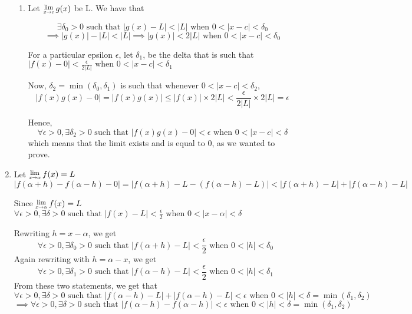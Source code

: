 \documentclass{article}
\newcommand{\Lim}[1]{\raisebox{0.5ex}{\scalebox{0.8}{$\displaystyle \lim_{#1}\;$}}}
\begin{document}
\begin{enumerate}
\begin{enumerate}
                         \item Let $\Lim{x \to c} g(x)$ be L. We have that 

                                 $$\exists \delta_0 > 0 \text{ such that } |g(x) - L| < |L|\text{ when } 0 < |x-c| < \delta_0$$
                                 $$\implies |g(x)| - |L| < |L| \implies |g(x)| < 2|L| \text{ when } 0 < |x-c| < \delta_0$$

                                 For a particular epsilon $\epsilon$, let $\delta_1$, be the delta that is such that 
                                 $|f(x) - 0 | < \frac{\epsilon}{2|L|} \text{ when } 0 < |x-c| < \delta_1$

                         Now, $\delta_2 = \min(\delta_0, \delta_1)$ is such that  whenever $0 < |x-c| < \delta_2$, 
                                 $$|f(x)g(x) - 0| = |f(x)g(x)| \leq |f(x)| \times 2|L| < \frac{\epsilon}{2|L|} \times 2|L| = \epsilon$$

                                 Hence,
                         $$\forall \epsilon>0, \exists \delta_2>0  \text{ such that } |f(x)g(x) - 0| < \epsilon  \text{ when } 0 < |x-c| < \delta$$
                         which means that the limit exists and is equal to $0$, as we wanted to prove.
                \end{enumerate}
        \item Let $\Lim{x\to \alpha}f(x) = L$
                $$|f(\alpha+h) - f(\alpha-h) - 0| = |f(\alpha+h) - L - (f(\alpha-h) - L)| < |f(\alpha+h)-L| + |f(\alpha-h) - L|$$

                Since $\Lim{x\to \alpha}f(x) = L$
                $\forall \epsilon>0, \exists \delta>0  \text{ such that } |f(x) - L| < \frac{\epsilon}{2}  \text{ when } 0 < |x-\alpha| < \delta $

                Rewriting $h = x-\alpha$, we get
                $$
                \forall \epsilon>0, \exists \delta_0>0  \text{ such that } |f(\alpha + h) - L| < \frac{\epsilon}{2}  \text{ when } 0 < |h| < \delta_0
                $$
                Again rewriting with $h = \alpha-x$, we get 
                $$
                \forall \epsilon>0, \exists \delta_1>0  \text{ such that } |f(\alpha - h) - L| < \frac{\epsilon}{2}  \text{ when } 0 < |h| < \delta_1
                $$
                From these two statements, we get that
                $$\forall \epsilon>0, \exists \delta>0  \text{ such that } |f(\alpha-h) - L| + |f(\alpha - h) - L| < \epsilon  \text{ when } 0 < |h| < \delta = \min(\delta_1, \delta_2)$$
                $$
                \implies \forall \epsilon>0, \exists \delta>0  \text{ such that } |f(\alpha-h) - f(\alpha - h)|< \epsilon  \text{ when } 0 < |h| < \delta = \min(\delta_1, \delta_2)
                $$


\end{enumerate}
\end{document}
